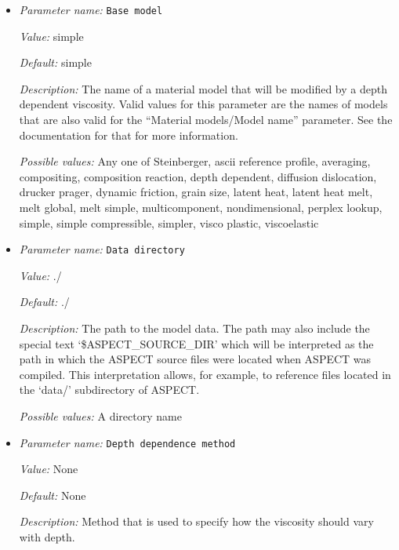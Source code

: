 \begin{itemize}
\item {\it Parameter name:} {\tt Base model}
\label{parameters:Material model/Depth dependent model/Base model}


{\it Value:} simple


{\it Default:} simple


{\it Description:} The name of a material model that will be modified by a depth dependent viscosity. Valid values for this parameter are the names of models that are also valid for the ``Material models/Model name'' parameter. See the documentation for that for more information.


{\it Possible values:} Any one of Steinberger, ascii reference profile, averaging, compositing, composition reaction, depth dependent, diffusion dislocation, drucker prager, dynamic friction, grain size, latent heat, latent heat melt, melt global, melt simple, multicomponent, nondimensional, perplex lookup, simple, simple compressible, simpler, visco plastic, viscoelastic
\item {\it Parameter name:} {\tt Data directory}
\label{parameters:Material model/Depth dependent model/Data directory}


{\it Value:} ./


{\it Default:} ./


{\it Description:} The path to the model data. The path may also include the special text `\$ASPECT\_SOURCE\_DIR' which will be interpreted as the path in which the ASPECT source files were located when ASPECT was compiled. This interpretation allows, for example, to reference files located in the `data/' subdirectory of ASPECT. 


{\it Possible values:} A directory name
\item {\it Parameter name:} {\tt Depth dependence method}
\label{parameters:Material model/Depth dependent model/Depth dependence method}


{\it Value:} None


{\it Default:} None


{\it Description:} Method that is used to specify how the viscosity should vary with depth. 



\end{itemize}
